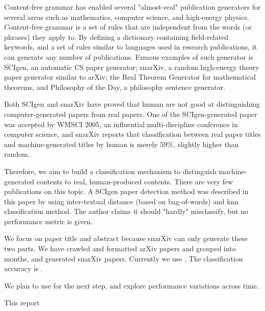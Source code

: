 
Content-free grammar has enabled several "almost-real" publication generators for several areas such as mathematics, computer science, and high-energy physics. Content-free grammar is a set of rules that are independent from the words (or phrases) they apply to. By defining a dictionary containing field-related keywords, and a set of rules similar to languages used in research publications, it can generate any number of publications. Famous examples of such generator is SCIgen, an automatic CS paper generator; snarXiv, a random high-energy theory paper generator similar to arXiv; the Real Theorem Generator for mathematical theorems, and Philosophy of the Day, a philosophy sentence generator.

Both SCIgen and snarXiv have proved that human are not good at distinguishing computer-generated papers from real papers. One of the SCIgen-generated paper was accepted by WMSCI 2005, an influential multi-discipline conference in computer science, and snarXiv reports that classification between real paper titles and machine-generated titles by human is merely 59\%, slightly higher than random.

Therefore, we aim to build a classification mechanism to distinguish machine-generated contents to real, human-produced contents. There are very few publications on this topic. A SCIgen paper detection method was described in this paper by using inter-textual distance (based on bag-of-words) and knn classification method. The author claims it should "hardly" misclassify, but no performance metric is given.

We focus on paper title and abstract because snarXiv can only generate these two parts. We have crawled and formatted \* arXiv papers and grouped into months, and generated \* snarXiv papers. Currently we use . The classification accuracy is .

We plan to use for the next step, and explore performance variations across time.

This report
